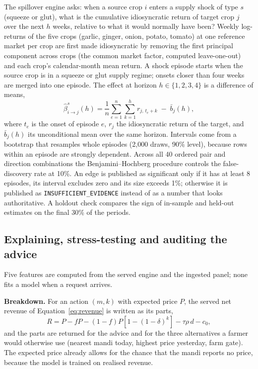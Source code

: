 The spillover engine asks: when a source crop $i$ enters a supply shock of type $s$ (squeeze or glut), what is the cumulative idiosyncratic return of target crop $j$ over the next $h$ weeks, relative to what it would normally have been? Weekly log-returns of the five crops (garlic, ginger, onion, potato, tomato) at one reference market per crop are first made idiosyncratic by removing the first principal component across crops (the common market factor, computed leave-one-out) and each crop's calendar-month mean return. A shock episode starts when the source crop is in a squeeze or glut supply regime; onsets closer than four weeks are merged into one episode. The effect at horizon $h\in\{1,2,3,4\}$ is a difference of means,
\begin{equation}
\hat\beta_{i\to j}^{s}(h)=\frac{1}{n}\sum_{e=1}^{n}\sum_{k=1}^{h} r_{j,\,t_e+k}\;-\;\bar b_j(h),
\label{eq:spill}
\end{equation}
where $t_e$ is the onset of episode $e$, $r_{j}$ the idiosyncratic return of the target, and $\bar b_j(h)$ its unconditional mean over the same horizon. Intervals come from a bootstrap that resamples whole episodes (2,000 draws, 90\% level), because rows within an episode are strongly dependent. Across all 40 ordered pair and direction combinations the Benjamini--Hochberg procedure controls the false-discovery rate at 10\%. An edge is published as significant only if it has at least 8 episodes, its interval excludes zero and its size exceeds 1\%; otherwise it is published as \texttt{INSUFFICIENT\_EVIDENCE} instead of as a number that looks authoritative. A holdout check compares the sign of in-sample and held-out estimates on the final 30\% of the periods.

\subsection{Explaining, stress-testing and auditing the advice}
\label{sec:insight-method}

Five features are computed from the served engine and the ingested panel; none fits a model when a request arrives.

\noindent\textbf{Breakdown.} For an action $(m,k)$ with expected price $P$, the served net revenue of Equation~\ref{eq:revenue} is written as its parts,
\begin{equation}
R = P - fP - (1-f)P\left[1-(1-\delta)^{k}\right] - \tau\rho\,d - c_0 ,
\label{eq:breakdown}
\end{equation}
and the parts are returned for the advice and for the three alternatives a farmer would otherwise use (nearest mandi today, highest price yesterday, farm gate). The expected price already allows for the chance that the mandi reports no price, because the model is trained on realised revenue.

